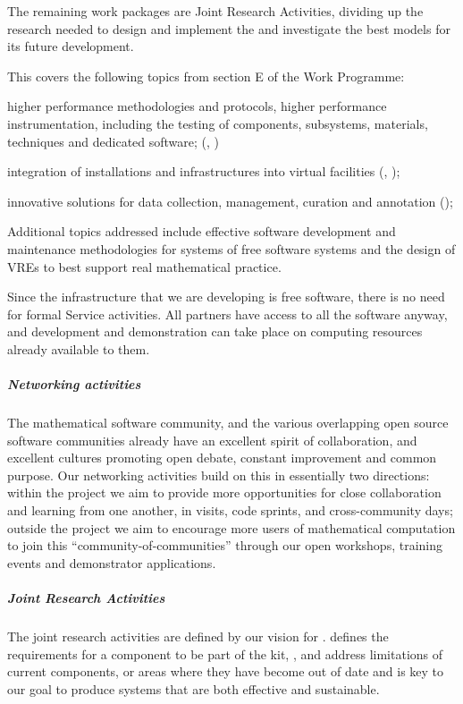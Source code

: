 The remaining work packages are Joint Research Activities, dividing up
the research needed to design and implement the \TheProject and
investigate the best models for its future development. 

This covers the following topics from section E of the Work Programme:

\begin{compactitem}
\item higher performance methodologies and protocols, higher performance instrumentation,
  including the testing of components, subsystems, materials, techniques and dedicated
  software; (, )
\item integration of installations and infrastructures into virtual
  facilities (, );
\item innovative solutions for data collection, management, curation
  and annotation ();
\end{compactitem}


Additional topics addressed include effective software development and
maintenance methodologies for systems of free software systems and the
design of VREs to best support real mathematical practice.

Since the infrastructure that we are developing is free software,
there is no need for formal Service activities. All partners have
access to all the software anyway, and development and demonstration
can take place on computing resources already available to them.

\subparagraph{Networking activities}
The mathematical software community, and the various overlapping open
source software communities already have an excellent spirit of
collaboration, and excellent cultures promoting open debate, constant
improvement and common purpose. Our networking activities build on
this in essentially two directions: within the project we aim to
provide more opportunities for close collaboration and learning
from one another, in visits, code sprints, and cross-community days;
outside the project we aim to encourage more users of mathematical
computation to join this ``community-of-communities'' through our open
workshops, training events and demonstrator applications.



\subparagraph{Joint Research Activities} The joint research activities are defined by our
vision for \TheProject.  defines the
requirements for a component to be part of the kit, ,  and
 address limitations of current components, or areas where they have
become out of date and  is key to our goal to produce systems that
are both effective and sustainable.



